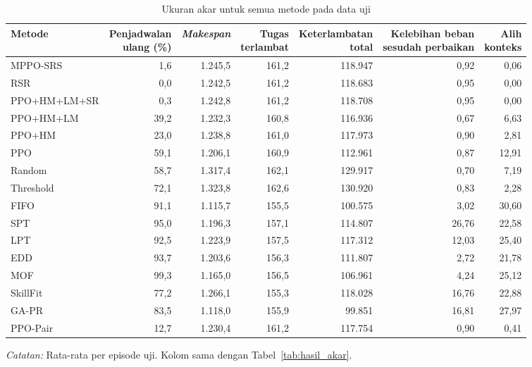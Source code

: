 \begin{table}[htbp]
\caption{Ukuran akar untuk semua metode pada data uji}
\label{tab:lampiran_akar}
\centering\scriptsize\setlength{\tabcolsep}{3pt}
\begin{tabular}{lrrrrrr}
\toprule
Metode & \shortstack[r]{Penjadwalan\\ulang (\%)} & \emph{Makespan} & \shortstack[r]{Tugas\\terlambat} & \shortstack[r]{Keterlambatan\\total} & \shortstack[r]{Kelebihan beban\\sesudah perbaikan} & \shortstack[r]{Alih\\konteks} \\
\midrule
MPPO-SRS & 1,6 & 1.245,5 & 161,2 & 118.947 & 0,92 & 0,06 \\
RSR & 0,0 & 1.242,5 & 161,2 & 118.683 & 0,95 & 0,00 \\
PPO+HM+LM+SR & 0,3 & 1.242,8 & 161,2 & 118.708 & 0,95 & 0,00 \\
PPO+HM+LM & 39,2 & 1.232,3 & 160,8 & 116.936 & 0,67 & 6,63 \\
PPO+HM & 23,0 & 1.238,8 & 161,0 & 117.973 & 0,90 & 2,81 \\
PPO & 59,1 & 1.206,1 & 160,9 & 112.961 & 0,87 & 12,91 \\
Random & 58,7 & 1.317,4 & 162,1 & 129.917 & 0,70 & 7,19 \\
Threshold & 72,1 & 1.323,8 & 162,6 & 130.920 & 0,83 & 2,28 \\
FIFO & 91,1 & 1.115,7 & 155,5 & 100.575 & 3,02 & 30,60 \\
SPT & 95,0 & 1.196,3 & 157,1 & 114.807 & 26,76 & 22,58 \\
LPT & 92,5 & 1.223,9 & 157,5 & 117.312 & 12,03 & 25,40 \\
EDD & 93,7 & 1.203,6 & 156,3 & 111.807 & 2,72 & 21,78 \\
MOF & 99,3 & 1.165,0 & 156,5 & 106.961 & 4,24 & 25,12 \\
SkillFit & 77,2 & 1.266,1 & 155,3 & 118.028 & 16,76 & 22,88 \\
GA-PR & 83,5 & 1.118,0 & 155,9 & 99.851 & 16,81 & 27,97 \\
PPO-Pair & 12,7 & 1.230,4 & 161,2 & 117.754 & 0,90 & 0,41 \\
\bottomrule
\end{tabular}
\par\smallskip\footnotesize\textit{Catatan:} Rata-rata per episode uji. Kolom sama dengan Tabel~\ref{tab:hasil_akar}.
\end{table}
